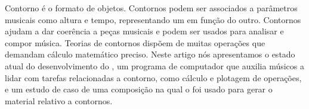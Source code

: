 Contorno é o formato de objetos. Contornos podem ser associados a
parâmetros musicais como altura e tempo, representando um em função do
outro. Contornos ajudam a dar coerência a peças musicais e podem ser
usados para analisar e compor música. Teorias de contornos dispõem de
muitas operações que demandam cálculo matemático preciso. Neste artigo
nós apresentamos o estado atual do desenvolvimento do \goiaba{}, um
programa de computador que auxilia músicos a lidar com tarefas
relacionadas a contorno, como cálculo e plotagem de operações, e um
estudo de caso de uma composição na qual o \goiaba{} foi usado para
gerar o material relativo a contornos.